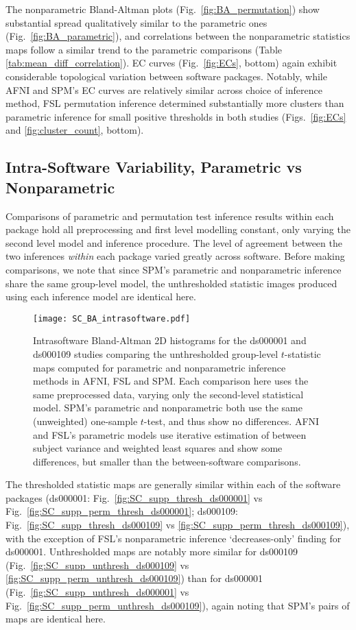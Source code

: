 The nonparametric Bland-Altman plots (Fig.\ \ref{fig:BA_permutation}) show substantial spread qualitatively similar to the parametric ones (Fig.\ \ref{fig:BA_parametric}), and correlations between the nonparametric statistics maps follow a similar trend to the parametric comparisons (Table \ref{tab:mean_diff_correlation}). EC curves (Fig.\ \ref{fig:ECs}, bottom) again exhibit considerable topological variation between software packages. Notably, while AFNI and SPM's EC curves are relatively similar across choice of inference method, FSL permutation inference determined substantially more clusters than parametric inference for small positive thresholds in both studies (Figs.\ \ref{fig:ECs} and \ref{fig:cluster_count}, bottom).

\subsection{Intra-Software Variability, Parametric vs Nonparametric}

Comparisons of parametric and permutation test inference results within each package hold all preprocessing and first level modelling constant, only varying the second level model and inference procedure. The level of agreement between the two inferences \textit{within} each package varied greatly across software. Before making comparisons, we note that since SPM's parametric and nonparametric inference share the same group-level model, the unthresholded statistic images produced using each inference model are identical here.

\begin{figure}[htbp]
\centering
	\texttt{[image: SC\_BA\_intrasoftware.pdf]}	
\caption{Intrasoftware Bland-Altman 2D histograms for the ds000001 and ds000109 studies comparing the unthresholded group-level $t$-statistic maps computed for parametric and nonparametric inference methods in AFNI, FSL and SPM. Each comparison here uses the same preprocessed data, varying only the second-level statistical model. SPM's parametric and nonparametric both use the same (unweighted) one-sample $t$-test, and thus show no differences. AFNI and FSL's parametric models use iterative estimation of between subject variance and weighted least squares and show some differences, but smaller than the between-software comparisons.}
\label{fig:BA_intrasoftware}
\end{figure}

The thresholded statistic maps are generally similar within each of the software packages (ds000001: Fig.\ \ref{fig:SC_supp_thresh_ds000001} vs Fig.\ \ref{fig:SC_supp_perm_thresh_ds000001}; ds000109: Fig.\ \ref{fig:SC_supp_thresh_ds000109} vs \ref{fig:SC_supp_perm_thresh_ds000109}), with the exception of FSL's nonparametric inference `decreases-only' finding for ds000001. Unthresholded maps are notably more similar for ds000109 (Fig.\ \ref{fig:SC_supp_unthresh_ds000109} vs \ref{fig:SC_supp_perm_unthresh_ds000109}) than for ds000001 (Fig.\ \ref{fig:SC_supp_unthresh_ds000001} vs Fig.\ \ref{fig:SC_supp_perm_unthresh_ds000109}), again noting that SPM's pairs of maps are identical here. 

